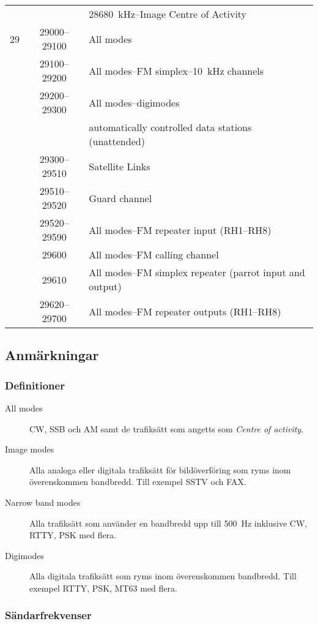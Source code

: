\begin{xtabular}{lcl}
     & & 28680~kHz--Image Centre of Activity\\
%
29   & 29000--29100 & All modes\\
     & 29100--29200 & All modes--FM simplex--10~kHz channels\\
     & 29200--29300 & All modes--digimodes\\
     & & automatically controlled data stations (unattended)\\
     & 29300--29510 & Satellite Links\\
     & 29510--29520 & Guard channel\\
     & 29520--29590 & All modes--FM repeater input (RH1--RH8)\\
     & 29600 & All modes--FM calling channel\\
     & 29610 & All modes--FM simplex repeater (parrot input and output)\\
& 29620--29700 & All modes--FM repeater outputs (RH1--RH8)\\
\end{xtabular}

\subsection{Anmärkningar}

\subsubsection{Definitioner}

\begin{description}
\item[All modes] CW, SSB och AM samt de trafiksätt som angetts som
\emph{Centre of activity}.

\item[Image modes] Alla analoga eller digitala trafiksätt för bildöverföring
som ryms inom överenskommen bandbredd. Till exempel SSTV och FAX.

\item[Narrow band modes] Alla trafiksätt som använder en bandbredd upp till
\qty{500}{\hertz} inklusive CW, RTTY, PSK med flera.

\item[Digimodes] Alla digitala trafiksätt som ryms inom överenskommen
bandbredd. Till exempel RTTY, PSK, MT63 med flera.
\end{description}

\subsubsection{Sändarfrekvenser}

